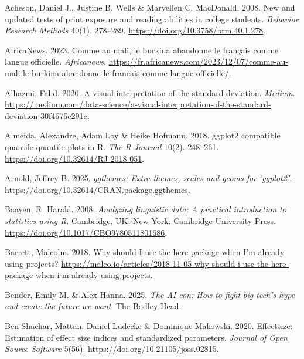 \documentclass[
  letterpaper,
  DIV=11,
  numbers=noendperiod]{scrreprt}
\newlength{\cslhangindent}
\newenvironment{CSLReferences}[2] %
 {\begin{list}{}{%
  \setlength{\itemindent}{0pt}
  \setlength{\leftmargin}{0pt}
  \setlength{\parsep}{0pt}
  \ifodd #1
   \setlength{\leftmargin}{\cslhangindent}
   \setlength{\itemindent}{-1\cslhangindent}
  \fi
  \setlength{\itemsep}{#2\baselineskip}}}
 {\end{list}}
\begin{document}
\protect{}\label{refs}
\begin{CSLReferences}{1}{0}
Acheson, Daniel J., Justine B. Wells \& Maryellen C. MacDonald. 2008.
New and updated tests of print exposure and reading abilities in college
students. \emph{Behavior Research Methods} 40(1). 278--289.
\url{https://doi.org/10.3758/brm.40.1.278}.

AfricaNews. 2023. Comme au mali, le burkina abandonne le français comme
langue officielle. \emph{Africanews}.
\url{https://fr.africanews.com/2023/12/07/comme-au-mali-le-burkina-abandonne-le-francais-comme-langue-officielle/}.

Alhazmi, Fahd. 2020. A visual interpretation of the standard deviation.
\emph{Medium}.
\url{https://medium.com/data-science/a-visual-interpretation-of-the-standard-deviation-30f4676c291c}.

Almeida, Alexandre, Adam Loy \& Heike Hofmann. 2018. ggplot2 compatible
quantile-quantile plots in {R}. \emph{The R Journal} 10(2). 248--261.
\url{https://doi.org/10.32614/RJ-2018-051}.

Arnold, Jeffrey B. 2025. \emph{{ggthemes}: Extra themes, scales and
geoms for 'ggplot2'}.
\url{https://doi.org/10.32614/CRAN.package.ggthemes}.

Baayen, R. Harald. 2008. \emph{Analyzing linguistic data: A practical
introduction to statistics using {R}}. Cambridge, UK; New York:
Cambridge University Press.
\url{https://doi.org/10.1017/CBO9780511801686}.

Barrett, Malcolm. 2018. Why should {I} use the here package when {I}'m
already using projects?
\url{https://malco.io/articles/2018-11-05-why-should-i-use-the-here-package-when-i-m-already-using-projects}.

Bender, Emily M. \& Alex Hanna. 2025. \emph{The AI con: How to fight big
tech's hype and create the future we want}. The Bodley Head.

Ben-Shachar, Mattan, Daniel Lüdecke \& Dominique Makowski. 2020.
Effectsize: Estimation of effect size indices and standardized
parameters. \emph{Journal of Open Source Software} 5(56).
\url{https://doi.org/10.21105/joss.02815}.


\end{CSLReferences}
\end{document}
